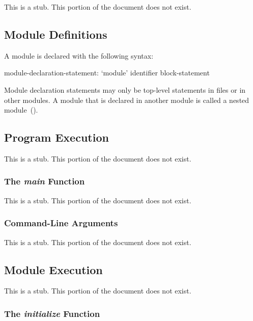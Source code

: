 \label{Modules}

This is a stub.  This portion of the document does not exist.

\subsection{Module Definitions}
\label{Module_Definitions}

A module is declared with the following syntax:
\begin{syntax}
module-declaration-statement:
  `module' identifier block-statement
\end{syntax}

Module declaration statements may only be top-level statements in
files or in other modules.  A module that is declared in another
module is called a nested module~().

\subsection{Program Execution}
\label{Program_Execution}

This is a stub.  This portion of the document does not exist.

\subsubsection{The {\em main} Function}
\label{The_em_main_Function}

This is a stub.  This portion of the document does not exist.

\subsubsection{Command-Line Arguments}
\label{Command-Line_Arguments}

This is a stub.  This portion of the document does not exist.

\subsection{Module Execution}
\label{Module_Execution}

This is a stub.  This portion of the document does not exist.

\subsubsection{The {\em initialize} Function}
\label{The_em_initialize_Function}


